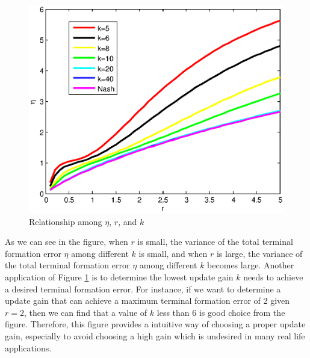 \documentclass[letterpaper, 10 pt, conference,onecolumn]{ieeeconf}  %
\begin{document}
\begin{figure}[h]
      \centering
      \includegraphics[scale=0.5]{PlotT.eps}
      \caption{Relationship among $\eta$, $r$, and $k$}\label{Relationship}
\end{figure}
As we can see in the figure, when $r$ is small, the variance of the total terminal formation error $\eta$ among different $k$ is small, and when $r$ is large, the variance of the total terminal formation error $\eta$ among different $k$ becomes large. Another application of Figure \ref{Relationship} is to determine the lowest update gain $k$ needs to achieve a desired terminal formation error. For instance, if we want to determine a update gain that can achieve a maximum terminal formation error of 2 given $r=2$, then we can find that a value of $k$ less than $6$ is good choice from the figure. Therefore, this figure provides a intuitive way of choosing a proper update gain, especially to avoid choosing a high gain which is undesired in many real life applications.
\end{document}
